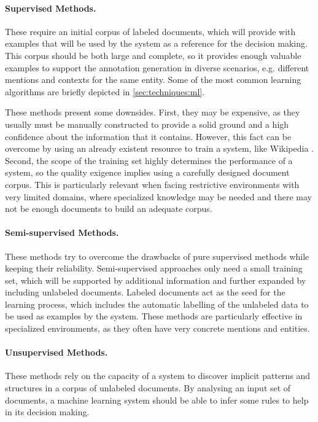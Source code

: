 \hfill
\begin{minipage}{.98\textwidth}
	
\paragraph{Supervised Methods.}

These require an initial corpus of labeled documents, which will provide with examples that will be used by the system as a reference for the decision making. This corpus should be both large and complete, so it provides enough valuable examples to support the annotation generation in diverse scenarios, e.g. different mentions and contexts for the same entity. Some of the most common learning algorithms are briefly depicted in \autoref{sec:techniques:ml}.

These methods present some downsides. First, they may be expensive, as they usually must be manually constructed to provide a solid ground and a high confidence about the information that it contains. However, this fact can be overcome by using an already existent resource to train a system, like Wikipedia \cite{milne2008}. Second, the scope of the training set highly determines the performance of a system, so the quality exigence implies using a carefully designed document corpus. This is particularly relevant when facing restrictive environments with very limited domains, where specialized knowledge may be needed and there may not be enough documents to build an adequate corpus.

\paragraph{Semi-supervised Methods.}

These methods try to overcome the drawbacks of pure supervised methods while keeping their reliability. Semi-supervised approaches only need a small training set, which will be supported by additional information and further expanded by including unlabeled documents. Labeled documents act as the seed for the learning process, which includes the automatic labelling of the unlabeled data to be used as examples by the system. These methods are particularly effective in specialized environments, as they often have very concrete mentions and entities.

\paragraph{Unsupervised Methods.}

These methods rely on the capacity of a system to discover implicit patterns and structures in a corpus of unlabeled documents. By analysing an input set of documents, a machine learning system should be able to infer some rules to help in its decision making.

\end{minipage}



